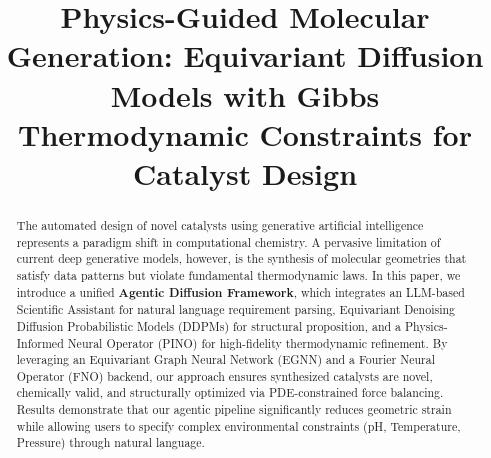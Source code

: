 \documentclass[conference]{IEEEtran}
\begin{document}
\title{Physics-Guided Molecular Generation: Equivariant Diffusion Models with Gibbs Thermodynamic Constraints for Catalyst Design}

\author{

}

\maketitle

\begin{abstract}
The automated design of novel catalysts using generative artificial intelligence represents a paradigm shift in computational chemistry. A pervasive limitation of current deep generative models, however, is the synthesis of molecular geometries that satisfy data patterns but violate fundamental thermodynamic laws. In this paper, we introduce a unified \textbf{Agentic Diffusion Framework}, which integrates an LLM-based Scientific Assistant for natural language requirement parsing, Equivariant Denoising Diffusion Probabilistic Models (DDPMs) for structural proposition, and a Physics-Informed Neural Operator (PINO) for high-fidelity thermodynamic refinement. By leveraging an Equivariant Graph Neural Network (EGNN) and a Fourier Neural Operator (FNO) backend, our approach ensures synthesized catalysts are novel, chemically valid, and structurally optimized via PDE-constrained force balancing. Results demonstrate that our agentic pipeline significantly reduces geometric strain while allowing users to specify complex environmental constraints (pH, Temperature, Pressure) through natural language.
\end{abstract}
\end{document}

